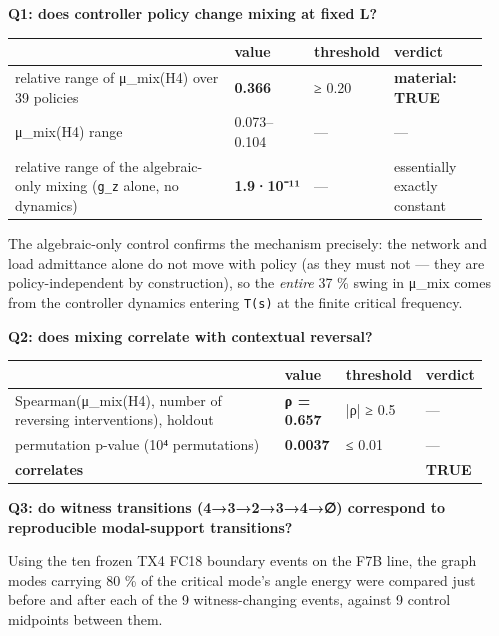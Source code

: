 \documentclass[10pt,a4paper]{article}
\begin{document}
\textbf{Q1: does controller policy change mixing at fixed L?}

{\small
\begin{longtable}{L{0.548\linewidth}L{0.102\linewidth}L{0.070\linewidth}L{0.219\linewidth}}
\toprule
\textbf{} & \textbf{value} & \textbf{threshold} & \textbf{verdict} \\
\midrule
\endhead
relative range of μ\_mix(H4) over 39 policies & \textbf{0.366} & ≥ 0.20 & \textbf{material: TRUE} \\
μ\_mix(H4) range & 0.073–0.104 & — & — \\
relative range of the algebraic-only mixing (\texttt{g\_\allowbreak{}z} alone, no dynamics) & \textbf{1.9·10⁻¹¹} & — & essentially exactly constant \\
\bottomrule
\end{longtable}}
The algebraic-only control confirms the mechanism precisely: the network and load admittance alone do not move with policy (as they must not — they are policy-independent by construction), so the \emph{entire} 37 \% swing in μ\_mix comes from the controller dynamics entering \texttt{T(s)} at the finite critical frequency.

\textbf{Q2: does mixing correlate with contextual reversal?}

{\small
\begin{longtable}{L{0.637\linewidth}L{0.131\linewidth}L{0.091\linewidth}L{0.081\linewidth}}
\toprule
\textbf{} & \textbf{value} & \textbf{threshold} & \textbf{verdict} \\
\midrule
\endhead
Spearman(μ\_mix(H4), number of reversing interventions), holdout & \textbf{ρ = 0.657} & |ρ| ≥ 0.5 & — \\
permutation p-value (10⁴ permutations) & \textbf{0.0037} & ≤ 0.01 & — \\
\textbf{correlates} &  &  & \textbf{TRUE} \\
\bottomrule
\end{longtable}}
\textbf{Q3: do witness transitions (4→3→2→3→4→∅) correspond to reproducible modal-support transitions?}

Using the ten frozen TX4 FC18 boundary events on the F7B line, the graph modes carrying 80 \% of the critical mode's angle energy were compared just before and after each of the 9 witness-changing events, against 9 control midpoints between them.
\end{document}
